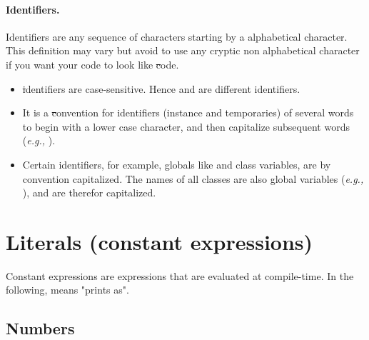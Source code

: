 \documentclass[a4paper,10pt,twoside]{book}
\begin{document}
\paragraph{Identifiers.}
Identifiers are any sequence of characters starting by a alphabetical character.
This definition may vary but avoid to use any cryptic non alphabetical character if you want your code
to look like \st code.

\begin{itemize}
\item \st identifiers are case-sensitive. Hence  and  are different identifiers.
\item It is a \st convention for identifiers (instance and temporaries) of several words to begin with a lower case character, and then capitalize subsequent words (\textit{e.g.,} ).
\item  Certain identifiers, for example, globals like  and class variables, are by convention capitalized. The names of all classes are also global variables (\textit{e.g.,} ), and are therefor capitalized.
\end{itemize}


\section{Literals (constant expressions)}


Constant expressions are expressions that are evaluated at compile-time.
In the following, \ct{-->} means "prints as".

\subsection{Numbers}
\end{document}
